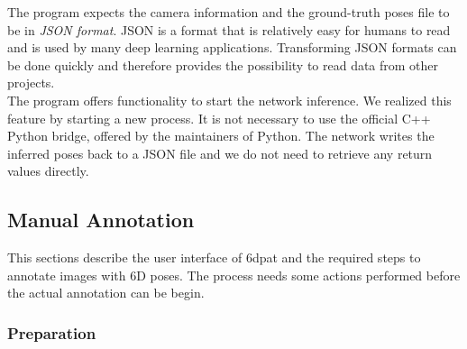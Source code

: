 The program expects the camera information and the ground-truth poses file to be in \textit{JSON format}. JSON is a format that is relatively easy for humans to read and is used by many deep learning applications. Transforming JSON formats can be done quickly and therefore provides the possibility to read data from other projects. \\

The program offers functionality to start the network inference. We realized this feature by starting a new process. It is not necessary to use the official C++ Python bridge, offered by the maintainers of Python. The network writes the inferred poses back to a JSON file and we do not need to retrieve any return values directly.

\subsection{Manual Annotation} 

This sections describe the user interface of \gls{6dpat} and the required steps to annotate images with 6D poses. The process needs some actions performed before the actual annotation can be begin. 

\subsubsection{Preparation}

